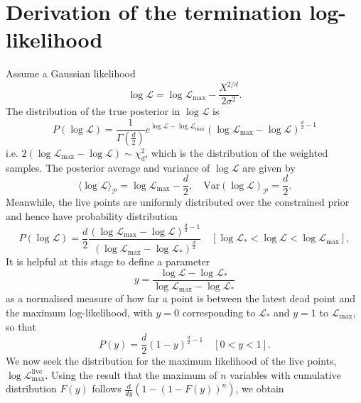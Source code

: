 \documentclass[usenatbib]{mnras}
\begin{document}
\section{Derivation of the termination log-likelihood }\label{app:fitting_function}
Assume a Gaussian likelihood
\begin{equation}\label{eq:logL}
	\log\mathcal{L} = \log\mathcal{L}_\mathrm{max} - \frac{X^{2/d}}{2\sigma^2}.
\end{equation}
The distribution of the true posterior in $\log\mathcal{L}$ is
\begin{equation}
    P(\log\mathcal{L}) = \frac{1}{\Gamma(\frac{d}{2})}e^{\log\mathcal{L}-\log\mathcal{L}_\mathrm{max}} (\log\mathcal{L}_\mathrm{max}-\log\mathcal{L})^{\frac{d}{2}-1}
\end{equation}
i.e. $2(\log\mathcal{L}_\mathrm{max}-\log\mathcal{L}) \sim \chi^2_{d}$, which is the distribution of the weighted samples. The posterior average and variance of $\log \mathcal{L}$ are given by
\begin{equation}
    \langle\log\mathcal{L}\rangle_\mathcal{P} = \log\mathcal{L}_\mathrm{max} - \frac{d}{2},  \quad \mathrm{Var}(\log\mathcal{L})_\mathcal{P} = \frac{d}{2}.
\end{equation}
Meanwhile, the live points are uniformly distributed over the constrained prior and hence have probability distribution
\begin{equation}
	P(\log\mathcal{L}) = \frac{d}{2}\frac{(\log\mathcal{L}_\mathrm{max}-\log\mathcal{L})^{\frac{d}{2}-1}}{(\log\mathcal{L}_\mathrm{max}-\log\mathcal{L}_*)^{\frac{d}{2}}} \quad [\log\mathcal{L}_* < \log\mathcal{L} <\log\mathcal{L}_\mathrm{max}],
    \label{eq:PL}
\end{equation}
It is helpful at this stage to define a parameter
\begin{equation}
    y = \frac{\log\mathcal{L}-\log\mathcal{L}_*}{\log\mathcal{L}_\mathrm{max}-\log\mathcal{L}_*}
    \label{eq:y}
\end{equation}
as a normalised measure of how far a point is between the latest dead point and the maximum log-likelihood, with $y=0$ corresponding to $\mathcal{L}_*$ and $y=1$ to $\mathcal{L}_\mathrm{max}$, so that
\begin{equation}
    P(y) = \frac{d}{2}(1-y)^{\frac{d}{2}-1} \quad [0<y<1].
    \label{eq:Py}
\end{equation}
We now seek the distribution for the maximum likelihood of the live points, $\log\mathcal{L}_\mathrm{max}^{\mathrm{live}}$. Using the result that the maximum of $n$ variables with cumulative distribution $F(y)$ follows $\frac{d}{dy}( 1- (1-F(y))^n)$, we obtain
\end{document}
